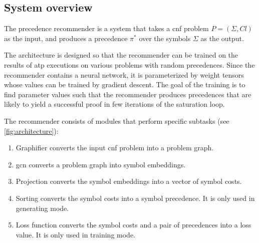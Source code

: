 \fi

\subsection{System overview}

The precedence recommender is a system that takes
a \gls{cnf} problem $P = (\Sigma, \mathit{Cl})$ as the input,
and produces a precedence $\pi^*$ over the symbols $\Sigma$ as the output.

The architecture is designed so that the recommender can be trained
on the results of \gls{atp} executions on various problems with random precedences.
Since the recommender contains a neural network,
it is parameterized by weight tensors
whose values can be trained by gradient descent.
The goal of the training is to find parameter values
such that the recommender produces precedences
that are likely to yield a successful proof in few iterations of the saturation loop.

The recommender consists of modules that perform specific subtasks (see \cref{fig:architecture}):
\begin{enumerate}
\item Graphifier converts the input \gls{cnf} problem into a problem graph.
\item \gls{gcn} converts a problem graph into symbol embeddings.
\item Projection converts the symbol embeddings into a vector of symbol costs.
\item Sorting converts the symbol costs into a symbol precedence.
It is only used in generating mode.
\item Loss function converts the symbol costs and a pair of precedences into a loss value.
It is only used in training mode.
\end{enumerate}

